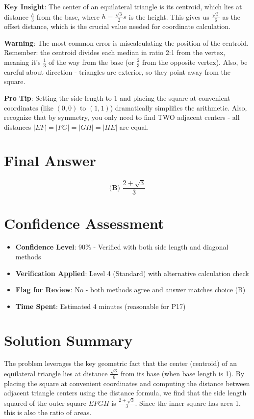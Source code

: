 \documentclass[]{article}
\begin{document}
\begin{keyinsightbox}
\textbf{Key Insight}: The center of an equilateral triangle is its centroid, which lies at distance $\frac{h}{3}$ from the base, where $h = \frac{\sqrt{3}}{2} s$ is the height. This gives us $\frac{\sqrt{3}}{6}$ as the offset distance, which is the crucial value needed for coordinate calculation.
\end{keyinsightbox}

\begin{warningbox}
\textbf{Warning}: The most common error is miscalculating the position of the centroid. Remember: the centroid divides each median in ratio 2:1 from the vertex, meaning it's $\frac{1}{3}$ of the way from the base (or $\frac{2}{3}$ from the opposite vertex). Also, be careful about direction - triangles are exterior, so they point away from the square.
\end{warningbox}

\begin{tipbox}
\textbf{Pro Tip}: Setting the side length to 1 and placing the square at convenient coordinates (like $(0,0)$ to $(1,1)$) dramatically simplifies the arithmetic. Also, recognize that by symmetry, you only need to find TWO adjacent centers - all distances $|EF| = |FG| = |GH| = |HE|$ are equal.
\end{tipbox}

\section*{Final Answer}

$$\boxed{\textbf{(B) } \frac{2+\sqrt{3}}{3}}$$

\section*{Confidence Assessment}
\begin{itemize}[leftmargin=*]
    \item \textbf{Confidence Level}: 90\% - Verified with both side length and diagonal methods
    \item \textbf{Verification Applied}: Level 4 (Standard) with alternative calculation check
    \item \textbf{Flag for Review}: No - both methods agree and answer matches choice (B)
    \item \textbf{Time Spent}: Estimated 4 minutes (reasonable for P17)
\end{itemize}

\section*{Solution Summary}

The problem leverages the key geometric fact that the center (centroid) of an equilateral triangle lies at distance $\frac{\sqrt{3}}{6}$ from its base (when base length is 1). By placing the square at convenient coordinates and computing the distance between adjacent triangle centers using the distance formula, we find that the side length squared of the outer square $EFGH$ is $\frac{2+\sqrt{3}}{3}$. Since the inner square has area 1, this is also the ratio of areas.
\end{document}
